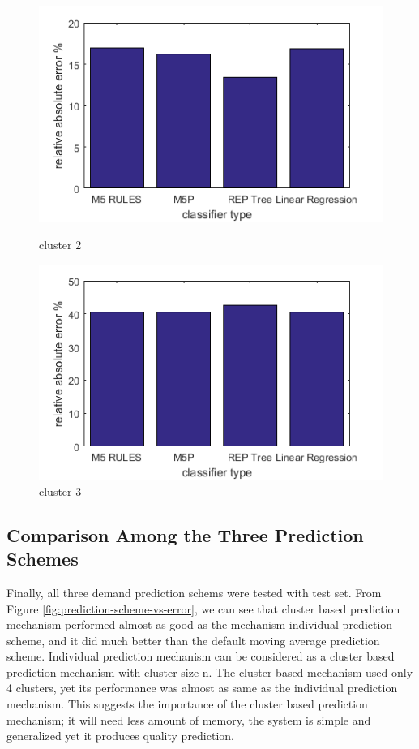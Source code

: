 \begin{figure}
\centering
\begin{minipage}{.5\textwidth}
  \centering
  \includegraphics[width=\linewidth]{cluster-2-diff-classifier-relative-abs.png}
  \caption{cluster 2}
  \label{fig:cluster-2-predictors}
\end{minipage}%
\begin{minipage}{.5\textwidth}
  \centering
  \includegraphics[width=\linewidth]{cluster-3-diff-classifier-relative-abs.png}
  \caption{cluster 3}
\label{fig:cluster-3-predictors}
\end{minipage}

\end{figure}


\subsection{Comparison Among the Three Prediction Schemes}

Finally, all three demand prediction schems were tested with test set. From Figure \ref{fig:prediction-scheme-vs-error}, we can see that cluster based prediction mechanism performed almost as good as the mechanism individual prediction scheme, and it did much better than the default moving average prediction scheme. Individual prediction mechanism can be considered as a cluster based prediction mechanism with cluster size n. The cluster based mechanism used only 4 clusters, yet its performance was almost as same as the individual prediction mechanism. This suggests the importance of the cluster based prediction mechanism; it will need less amount of memory, the system is simple and generalized yet it produces quality prediction.

